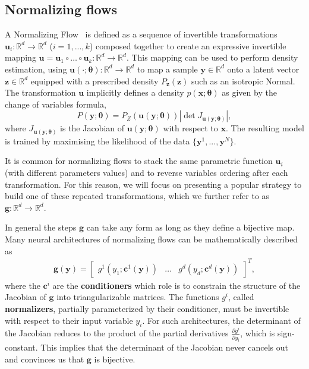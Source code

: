\subsection{Normalizing flows}
A Normalizing Flow~\citep[NF, ][]{rezende2015variational} is defined as a sequence of invertible transformations $\mathbf{u}_i : \mathbb{R}^d \to \mathbb{R}^d$  ($i=1, ..., k$) composed together to create an expressive invertible mapping $\mathbf{u} = \mathbf{u}_1 \circ \dots \circ \mathbf{u}_k : \mathbb{R}^d \to \mathbb{R}^d$. This mapping can be used to perform density estimation, using $\mathbf{u}(\cdot ;\mathbf{\theta}): \mathbb{R}^d \rightarrow \mathbb{R}^d$ to map a sample $\mathbf{y} \in \mathbb{R}^d$ onto a latent vector $\mathbf{z} \in \mathbb{R}^d$ equipped with a prescribed density $P_{\mathbf{z}}(\mathbf{z})$ such as an isotropic Normal. The transformation $\mathbf{u}$ implicitly defines a density $p(\mathbf{x}; \mathbf{\theta})$ as given by the change of variables formula,
\begin{equation}
    P(\mathbf{y}; \mathbf{\theta}) = P_Z(\mathbf{u}(\mathbf{y};\mathbf{\theta})) \left| \det  J_{\mathbf{u}(\mathbf{y};\mathbf{\theta})} \right|, \label{eq:NF_DE}
\end{equation}
where $J_{\mathbf{u}(\mathbf{y};\mathbf{\theta})}$ is the Jacobian of $\mathbf{u}(\mathbf{y};\mathbf{\theta})$ with respect to $\mathbf x$.
The resulting model is trained by maximising the likelihood of the data $\{\mathbf{y}^1, ..., \mathbf{y}^N\}$.

It is common for normalizing flows to stack the same parametric function $\mathbf{u}_i$ (with different parameters values) and to reverse variables ordering after each transformation. For this reason, we will focus on presenting a popular strategy to build one of these repeated transformations, which we further refer to as $\mathbf{g}: \mathbb{R}^d\rightarrow \mathbb{R}^d$.

In general the steps $\mathbf{g}$ can take any form as long as they define a bijective map. Many neural architectures of normalizing flows can be mathematically described as
\begin{align}
    \mathbf{g}(\mathbf{y}) = \begin{bmatrix}
g^1(y_{1}; \mathbf{c}^1(\mathbf{y}))  & \hdots & g^d(y_{d}; \mathbf{c}^d(\mathbf{y}))
\end{bmatrix}^T,\label{eq:gnf}
\end{align}
where the $\mathbf{c}^i$ are the \textbf{conditioners} which role is to constrain the structure of the Jacobian of $\mathbf{g}$ into triangularizable matrices. The functions $g^i$, called \textbf{normalizers}, partially parameterized by their conditioner, must be invertible with respect to their input variable $y_i$. For such architectures, the determinant of the Jacobian reduces to the product of the partial derivatives $\frac{\partial g^i}{\partial y_i}$, which is sign-constant. This implies that the determinant of the Jacobian never cancels out and convinces us that $\mathbf{g}$ is bijective.

